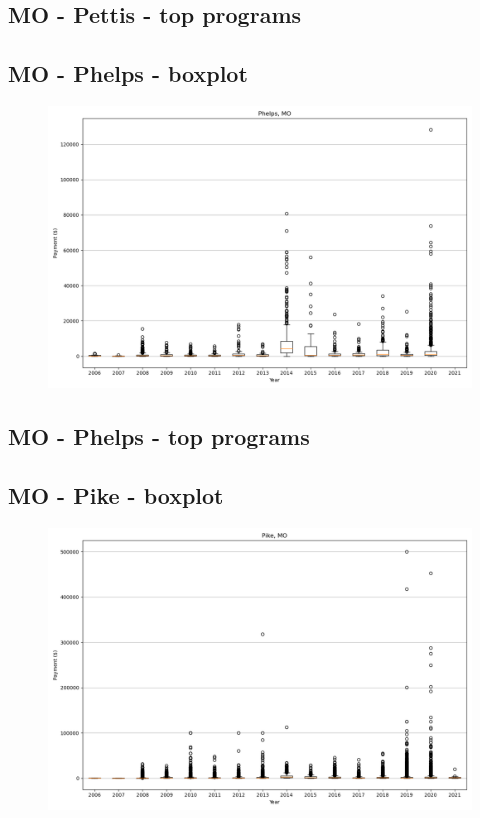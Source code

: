 \subsection*{MO - Pettis - top programs}

\newpage
\subsection*{MO - Phelps - boxplot}
\begin{figure}[h]
\centering
\includegraphics[width=7in]{../output/boxplots/counties/Phelps-MO_boxplot.png}
\end{figure}


\subsection*{MO - Phelps - top programs}

\newpage
\subsection*{MO - Pike - boxplot}
\begin{figure}[h]
\centering
\includegraphics[width=7in]{../output/boxplots/counties/Pike-MO_boxplot.png}
\end{figure}


